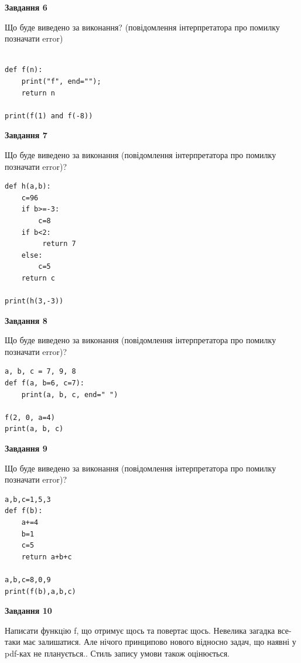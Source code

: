 \documentclass[12pt, ukrainian]{article}
\begin{document}
{\begin {large}
{\begin {center}\textbf{Завдання 6}\end {center}}

Що буде виведено за виконання? (повідомлення інтерпретатора про помилку позначати error)\par
\begin{verbatim}

def f(n):
    print("f", end="");
    return n

print(f(1) and f(-8))
\end{verbatim}

{\begin {center}\textbf{Завдання 7}\end {center}}

Що буде виведено за виконання (повідомлення інтерпретатора про помилку позначати error)?\par
\begin{verbatim}
def h(a,b):
    c=96
    if b>=-3:
        c=8
    if b<2:
         return 7
    else: 
        c=5
    return c

print(h(3,-3))
\end{verbatim}

{\begin {center}\textbf{Завдання 8}\end {center}}

Що буде виведено за виконання (повідомлення інтерпретатора про помилку позначати error)?\par
\begin{verbatim}
a, b, c = 7, 9, 8
def f(a, b=6, c=7):
    print(a, b, c, end=" ")

f(2, 0, a=4)
print(a, b, c)
\end{verbatim}

{\begin {center}\textbf{Завдання 9}\end {center}}

Що буде виведено за виконання (повідомлення інтерпретатора про помилку позначати error)?\par
\begin{verbatim}
a,b,c=1,5,3
def f(b):
    a+=4
    b=1
    c=5
    return a+b+c

a,b,c=8,0,9
print(f(b),a,b,c)
\end{verbatim}

{\begin {center}\textbf{Завдання 10}\end {center}}


Написати функцiю f, що отримує щось та повертає щось. Невелика загадка все-таки має залишатися. Але нічого принципово нового відносно задач, що наявні у pdf-ках не планується.. Стиль запису умови також оцінюється.\par
\end {large}}
\newpage
\end{document}
